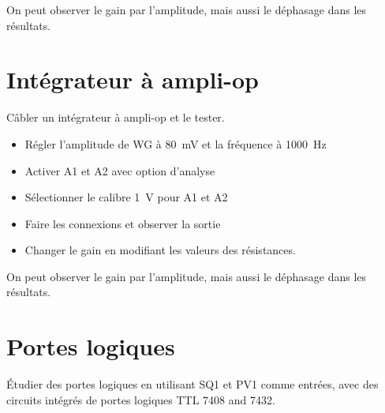 \documentclass[a4paper,12pt,french]{sphinxmanual}
\let\sphinxpxdimen\pdfpxdimen\else\newdimen\sphinxpxdimen
\begin{document}

On peut observer le gain par l’amplitude, mais aussi le déphasage dans
les résultats.


\section{Intégrateur à ampli-op}
\label{\detokenize{3.8:integrateur-a-ampli-op}}\label{\detokenize{3.8::doc}}

Câbler un intégrateur à ampli-op et le tester.

\noindent\sphinxincludegraphics[width=300\sphinxpxdimen]{{opamp-int}.pdf}

\begin{itemize}
\item {} 
Régler l’amplitude de WG à 80 mV et la fréquence à 1000 Hz

\item {} 
Activer A1 et A2 avec option d’analyse

\item {} 
Sélectionner le calibre 1 V pour A1 et A2

\item {} 
Faire les connexions et observer la sortie

\item {} 
Changer le gain en modifiant les valeurs des résistances.

\end{itemize}


On peut observer le gain par l’amplitude, mais aussi le déphasage dans
les résultats.


\section{Portes logiques}
\label{\detokenize{3.9:portes-logiques}}\label{\detokenize{3.9::doc}}

Étudier des portes logiques en utilisant SQ1 et PV1 comme entrées, avec
des circuits intégrés de portes logiques TTL 7408 and 7432.

\end{document}
